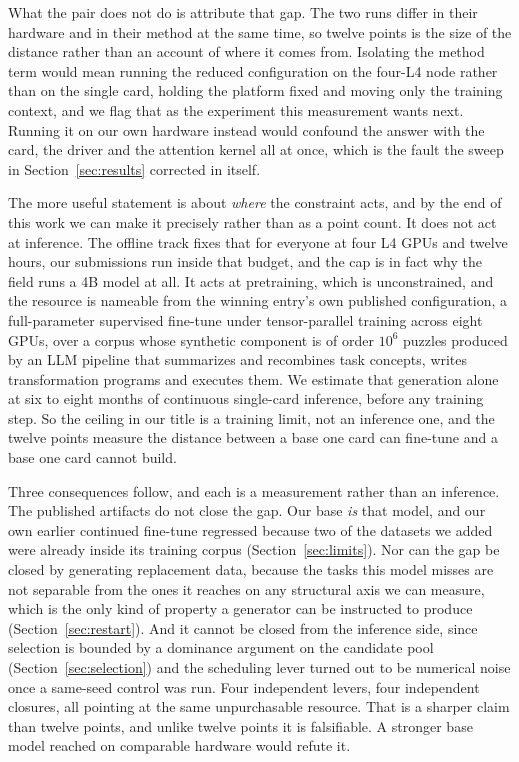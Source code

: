 \documentclass[11pt]{article}
\begin{document}
What the pair does not do is attribute that gap. The two runs differ in their hardware and in their method
at the same time, so twelve points is the size of the distance rather than an account of where it comes
from. Isolating the method term would mean running the reduced configuration on the four-L4 node rather
than on the single card, holding the platform fixed and moving only the training context, and we flag that
as the experiment this measurement wants next. Running it on our own hardware instead would confound the
answer with the card, the driver and the attention kernel all at once, which is the fault the sweep in
Section~\ref{sec:results} corrected in itself.

The more useful statement is about \emph{where} the constraint acts, and by the end of this work we can
make it precisely rather than as a point count. It does not act at inference. The offline track fixes
that for everyone at four L4 GPUs and twelve hours, our submissions run inside that budget, and the cap
is in fact why the field runs a 4B model at all. It acts at pretraining, which is unconstrained, and the
resource is nameable from the winning entry's own published configuration, a full-parameter supervised
fine-tune under tensor-parallel training across eight GPUs, over a corpus whose synthetic component is
of order $10^6$ puzzles produced by an LLM pipeline that summarizes and recombines task concepts, writes
transformation programs and executes them. We estimate that generation alone at six to eight months of
continuous single-card inference, before any training step. So the ceiling in our title is a training
limit, not an inference one, and the twelve points measure the distance between a base one card
can fine-tune and a base one card cannot build.

Three consequences follow, and each is a measurement rather than an inference. The published artifacts do
not close the gap. Our base \emph{is} that model, and our own earlier continued fine-tune regressed
because two of the datasets we added were already inside its training corpus
(Section~\ref{sec:limits}). Nor can the gap be closed by generating replacement data, because the tasks
this model misses are not separable from the ones it reaches on any structural axis we can measure,
which is the only kind of property a generator can be instructed to produce
(Section~\ref{sec:restart}). And it cannot be closed from the inference side, since selection is bounded
by a dominance argument on the candidate pool (Section~\ref{sec:selection}) and the scheduling lever
turned out to be numerical noise once a same-seed control was run. Four independent levers, four
independent closures, all pointing at the same unpurchasable resource. That is a sharper claim than
twelve points, and unlike twelve points it is falsifiable. A stronger base model reached on comparable
hardware would refute it.
\end{document}
